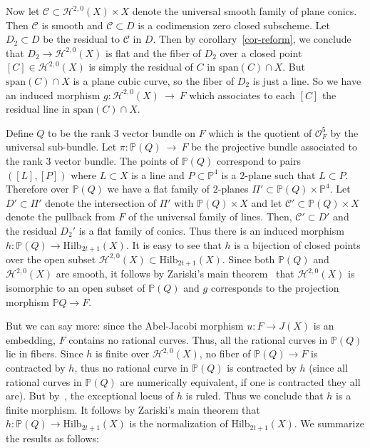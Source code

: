 \documentclass[twoside,12pt,reqno]{amsart}
\theoremstyle{plain}
\theoremstyle{definition}
\newcommand{\Hdg}[2]{\mathcal{H}^{#1,#2}}
\newcommand{\PP}{\mathbb{P}}
\newcommand{\HI}[2]{\text{Hilb}_{#1}(#2)}
\def\ps{\vspace{4pt}}
\newcommand{\OO}{\mathcal O}
\begin{document}
\ps

Now let $\mathcal{C}\subset \Hdg{2}{0}(X)\times X$ denote the
universal smooth family of plane conics.  Then $\mathcal{C}$ is
smooth and $\mathcal{C}\subset D$ is a codimension zero closed
subscheme.  Let $D_2\subset D$ be the residual to $\mathcal{C}$ in
$D$.  Then by corollary~\ref{cor-reform}, we conclude that
$D_2\rightarrow \Hdg{2}{0}(X)$ is flat and the fiber of $D_2$ over a
closed 
point $[C]\in\Hdg{2}{0}(X)$ is simply the residual of $C$ in
$\text{span}(C)\cap X$.  But $\text{span}(C)\cap X$ is a plane cubic
curve, so the fiber of $D_2$ is just a line.  So we have an induced
morphism $g:\Hdg{2}{0}(X)~\rightarrow~ F$ which associates to
each $[C]$ the residual line in $\text{span}(C)\cap X$.  

\ps

Define $Q$ to be the rank 3 vector bundle on $F$ which is the quotient 
of $\OO_F^5$ by the universal sub-bundle.  
Let $\pi:\PP(Q)~\rightarrow~F$ be the projective bundle associated to
the rank 3 vector bundle.  The points of $\PP(Q)$ correspond to pairs
$([L],[P])$ where $L\subset X$ is a line and $P\subset \PP^4$ is a
$2$-plane such that $L\subset P$.  Therefore over $\PP(Q)$ we have a
flat family of $2$-planes $\Pi'\subset \PP(Q)\times \PP^4$.  
Let $D'\subset \Pi'$ denote the intersection of $\Pi'$ with $\PP(Q)
\times X$ and
let
$\mathcal{C}'\subset \PP(Q)\times X$ denote the pullback from $F$ of
the universal family of lines.  Then, $\mathcal{C}'\subset D'$ and the 
residual $D_2'$ is a flat family of conics.  Thus there is an induced
morphism $h:\PP(Q)\rightarrow \HI{2t+1}{X}$.  It is easy to see that
$h$ is a bijection of closed points over the open subset
$\Hdg{2}{0}(X)\subset \HI{2t+1}{X}$.  Since both $\PP(Q)$ and
$\Hdg{2}{0}(X)$ are smooth, it follows by Zariski's main
theorem~\cite[p. 288-289]{RB} that $\Hdg{2}{0}(X)$ is isomorphic to an 
open subset of 
$\PP(Q)$ and $g$ corresponds to the projection morphism $\PP
Q\rightarrow F$.  

\ps

But we can say more:  since the Abel-Jacobi morphism 
$u:F\rightarrow J(X)$ is an embedding, $F$ contains no rational
curves.  Thus, all the rational curves in $\PP(Q)$ lie in fibers.
Since $h$ is finite over $\Hdg{2}{0}(X)$,
no fiber of $\PP(Q)\rightarrow F$ is contracted by $h$, thus no
rational curve in $\PP(Q)$ is contracted by $h$ (since all rational
curves in $\PP(Q)$ are numerically equivalent, if one is contracted they 
all are).
But by~\cite[theorem VI.1.2]{K}, the exceptional locus of $h$ is
ruled.  Thus we conclude that $h$ is a finite morphism.  It follows by 
Zariski's main theorem that $h:\PP(Q)\rightarrow \HI{2t+1}{X}$ is the
normalization of $\HI{2t+1}{X}$.  We summarize the results as follows:
\end{document}
